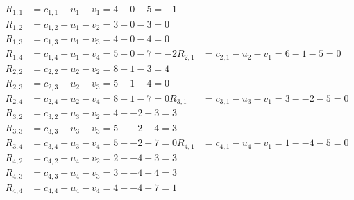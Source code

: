 \[
\begin{aligned}
R_{1,1} &= c_{1,1} - u_{1} - v_{1} = 4 - 0 - 5 = -1 \\
R_{1,2} &= c_{1,2} - u_{1} - v_{2} = 3 - 0 - 3 = 0 \\
R_{1,3} &= c_{1,3} - u_{1} - v_{3} = 4 - 0 - 4 = 0 \\
R_{1,4} &= c_{1,4} - u_{1} - v_{4} = 5 - 0 - 7 = -2 
R_{2,1} &= c_{2,1} - u_{2} - v_{1} = 6 - 1 - 5 = 0 \\
R_{2,2} &= c_{2,2} - u_{2} - v_{2} = 8 - 1 - 3 = 4 \\
R_{2,3} &= c_{2,3} - u_{2} - v_{3} = 5 - 1 - 4 = 0 \\
R_{2,4} &= c_{2,4} - u_{2} - v_{4} = 8 - 1 - 7 = 0 
R_{3,1} &= c_{3,1} - u_{3} - v_{1} = 3 - -2 - 5 = 0 \\
R_{3,2} &= c_{3,2} - u_{3} - v_{2} = 4 - -2 - 3 = 3 \\
R_{3,3} &= c_{3,3} - u_{3} - v_{3} = 5 - -2 - 4 = 3 \\
R_{3,4} &= c_{3,4} - u_{3} - v_{4} = 5 - -2 - 7 = 0 
R_{4,1} &= c_{4,1} - u_{4} - v_{1} = 1 - -4 - 5 = 0 \\
R_{4,2} &= c_{4,2} - u_{4} - v_{2} = 2 - -4 - 3 = 3 \\
R_{4,3} &= c_{4,3} - u_{4} - v_{3} = 3 - -4 - 4 = 3 \\
R_{4,4} &= c_{4,4} - u_{4} - v_{4} = 4 - -4 - 7 = 1 
\end{aligned}
\]

